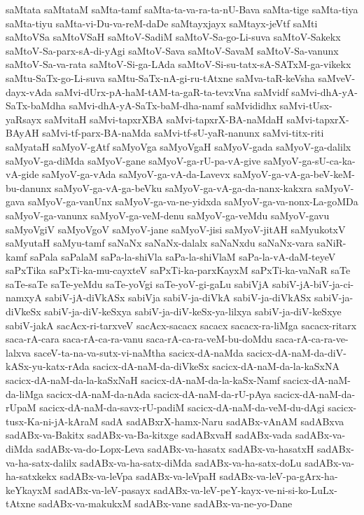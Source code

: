 {saMtata
saMtataM
saMta-tamf
saMta-ta-va-ra-ta-nU-Bava
saMta-tige
saMta-tiya
saMta-tiyu
saMta-vi-Du-va-reM-daDe
saMtayxjayx
saMtayx-jeVtf
saMti
saMtoVSa
saMtoVSaH
saMtoV-SadiM
saMtoV-Sa-go-Li-suva
saMtoV-Sakekx
saMtoV-Sa-parx-sA-di-yAgi
saMtoV-Sava
saMtoV-SavaM
saMtoV-Sa-vanunx
saMtoV-Sa-va-rata
saMtoV-Si-ga-LAda
saMtoV-Si-su-tatx-sA-SATxM-ga-vikekx
saMtu-SaTx-go-Li-suva
saMtu-SaTx-nA-gi-ru-tAtxne
saMva-taR-keVsha
saMveV-dayx-vAda
saMvi-dUrx-pA-haM-tAM-ta-gaR-ta-tevxVna
saMvidf
saMvi-dhA-yA-SaTx-baMdha
saMvi-dhA-yA-SaTx-baM-dha-namf
saMvididhx
saMvi-tUsx-yaRsayx
saMvitaH
saMvi-tapxrXBA
saMvi-tapxrX-BA-naMdaH
saMvi-tapxrX-BAyAH
saMvi-tf-parx-BA-naMda
saMvi-tf-sU-yaR-nanunx
saMvi-titx-riti
saMyataH
saMyoV-gAtf
saMyoVga
saMyoVgaH
saMyoV-gada
saMyoV-ga-dalilx
saMyoV-ga-diMda
saMyoV-gane
saMyoV-ga-rU-pa-vA-give
saMyoV-ga-sU-ca-ka-vA-gide
saMyoV-ga-vAda
saMyoV-ga-vA-da-Lavevx
saMyoV-ga-vA-ga-beV-keM-bu-danunx
saMyoV-ga-vA-ga-beVku
saMyoV-ga-vA-ga-da-nanx-kakxra
saMyoV-gava
saMyoV-ga-vanUnx
saMyoV-ga-va-ne-yidxda
saMyoV-ga-va-nonx-La-goMDa
saMyoV-ga-vanunx
saMyoV-ga-veM-denu
saMyoV-ga-veMdu
saMyoV-gavu
saMyoVgiV
saMyoVgoV
saMyoV-jane
saMyoV-jisi
saMyoV-jitAH
saMyukotxV
saMyutaH
saMyu-tamf
saNaNx
saNaNx-dalalx
saNaNxdu
saNaNx-vara
saNiR-kamf
saPala
saPalaM
saPa-la-shiVla
saPa-la-shiVlaM
saPa-la-vA-daM-teyeV
saPxTika
saPxTi-ka-mu-cayxteV
saPxTi-ka-parxKayxM
saPxTi-ka-vaNaR
saTe
saTe-saTe
saTe-yeMdu
saTe-yoVgi
saTe-yoV-gi-gaLu
sabiVjA
sabiV-jA-biV-ja-ci-namxyA
sabiV-jA-diVkASx
sabiVja
sabiV-ja-diVkA
sabiV-ja-diVkASx
sabiV-ja-diVkeSx
sabiV-ja-diV-keSxya
sabiV-ja-diV-keSx-ya-lilxya
sabiV-ja-diV-keSxye
sabiV-jakA
sacAcx-ri-tarxveV
sacAcx-sacacx
sacacx
sacacx-ra-liMga
sacacx-ritarx
saca-rA-cara
saca-rA-ca-ra-vanu
saca-rA-ca-ra-veM-bu-doMdu
saca-rA-ca-ra-ve-lalxva
saceV-ta-na-va-sutx-vi-naMtha
sacicx-dA-naMda
sacicx-dA-naM-da-diV-kASx-yu-katx-rAda
sacicx-dA-naM-da-diVkeSx
sacicx-dA-naM-da-la-kaSxNA
sacicx-dA-naM-da-la-kaSxNaH
sacicx-dA-naM-da-la-kaSx-Namf
sacicx-dA-naM-da-liMga
sacicx-dA-naM-da-nAda
sacicx-dA-naM-da-rU-pAya
sacicx-dA-naM-da-rUpaM
sacicx-dA-naM-da-savx-rU-padiM
sacicx-dA-naM-da-veM-du-dAgi
sacicx-tusx-Ka-ni-jA-kAraM
sadA
sadABxrX-hamx-Naru
sadABx-vAnAM
sadABxva
sadABx-va-Bakitx
sadABx-va-Ba-kitxge
sadABxvaH
sadABx-vada
sadABx-va-diMda
sadABx-va-do-Lopx-Leva
sadABx-va-hasatx
sadABx-va-hasatxH
sadABx-va-ha-satx-dalilx
sadABx-va-ha-satx-diMda
sadABx-va-ha-satx-doLu
sadABx-va-ha-satxkekx
sadABx-va-leVpa
sadABx-va-leVpaH
sadABx-va-leV-pa-gArx-ha-keYkayxM
sadABx-va-leV-pasayx
sadABx-va-leV-peY-kayx-ve-ni-si-ko-LuLx-tAtxne
sadABx-va-makukxM
sadABx-vane
sadABx-va-ne-yo-Dane
}

